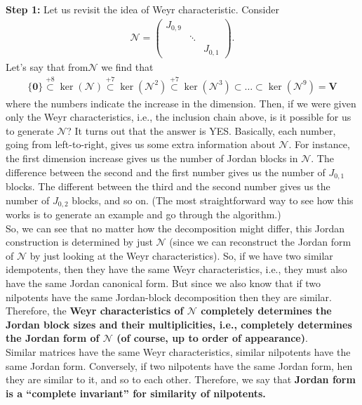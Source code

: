 \documentclass{article}
\theoremstyle{definition}
\newcommand{\V}{\mathbf{V}}
\begin{document}
\textbf{Step 1:} Let us revisit the idea of Weyr characteristic. Consider 
\begin{align*}
\mathcal{N} = \begin{pmatrix}
J_{0,9} & & \\
& \ddots & \\
& & J_{0,1}
\end{pmatrix}.
\end{align*}
Let's say that from$\mathcal{N}$ we find that
\begin{align*}
\{ \mathbf{0} \} \stackrel{+8}{\subset} \ker(\mathcal{N}) \stackrel{+7}{\subset} \ker(\mathcal{N}^2) \stackrel{+7}{\subset} \ker(\mathcal{N}^3) \subset \dots \subset \ker(\mathcal{N}^9) = \V
\end{align*}
where the numbers indicate the increase in the dimension. Then, if we were given only the Weyr characteristics, i.e., the inclusion chain above, is it possible for us to generate $\mathcal{N}$? It turns out that the answer is YES. Basically, each number, going from left-to-right, gives us some extra information about $\mathcal{N}$. For instance, the first dimension increase gives us the number of Jordan blocks in $\mathcal{N}$. The difference between the second and the first number gives us the number of $J_{0,1}$ blocks. The different between the third and the second number gives us the number of $J_{0,2}$ blocks, and so on. (The most straightforward way to see how this works is to generate an example and go through the algorithm.)\\

So, we can see that no matter how the decomposition might differ, this Jordan construction is determined by just $\mathcal{N}$ (since we can reconstruct the Jordan form of $\mathcal{N}$ by just looking at the Weyr characteristics). So, if we have two similar idempotents, then they have the same Weyr characteristics, i.e., they must also have the same Jordan canonical form. But since we also know that if two nilpotents have the same Jordan-block decomposition then they are similar. Therefore, the \textbf{Weyr characteristics of $\mathcal{N}$ completely determines the Jordan block sizes and their multiplicities, i.e., completely determines the Jordan form of $\mathcal{N}$ (of course, up to order of appearance)}. \\

Similar matrices have the same Weyr characteristics, similar nilpotents have the same Jordan form. Conversely, if two nilpotents have the same Jordan form, hen they are similar to it, and so to each other. Therefore, we say that \textbf{Jordan form is a ``complete invariant'' for similarity of nilpotents.}\\
\end{document}
